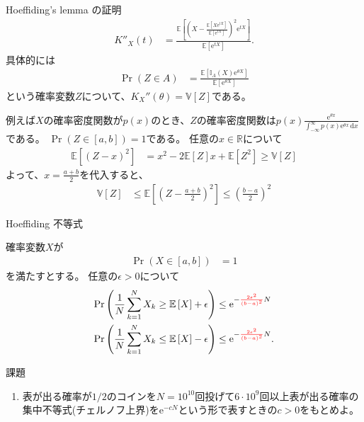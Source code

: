 \documentclass[lualatex,handout]{beamer}
\newcommand{\emm}[1]{\textcolor{red}{#1}}
\newcommand{\expt}[1]{\mathbb{E}\left[#1\right]}
\newcommand{\var}[1]{\mathbb{V}\left[#1\right]}
\newcommand\dx{{\,\mathrm{d}x}}
\theoremstyle{definition}
\begin{document}
\begin{frame}{Hoeffiding's lemma の証明}
\small
\begin{align*}
K''_X(t) 
&= \frac{\expt{\left(X-\frac{\expt{X\mathrm{e}^{tX}}}{\expt{\mathrm{e}^{tX}}}\right)^2\mathrm{e}^{tX}}}{\expt{\mathrm{e}^{tX}}}.
\end{align*}
具体的には
\begin{align*}
\Pr(Z\in A) &= \frac{\expt{\mathbb{I}_A(X)\mathrm{e}^{\theta X}}}{\expt{\mathrm{e}^{\theta X}}}
\end{align*}
という確率変数$Z$について、$K_X''(\theta) = \var{Z}$である。

例えば$X$の確率密度関数が$p(x)$のとき、$Z$の確率密度関数は$p(x)\frac{\mathrm{e}^{\theta x}}{\int_{-\infty}^\infty p(x)\mathrm{e}^{\theta x}\dx}$である。
$\Pr(Z\in[a,b])=1$である。
任意の$x\in\mathbb{R}$について
\begin{align*}
\expt{(Z-x)^2} &= x^2 - 2\expt{Z}x + \expt{Z^2}\ge \var{Z}
\end{align*}
よって、$x=\frac{a+b}2$を代入すると、
\begin{align*}
\var{Z} &\le \expt{\left(Z-\frac{a+b}2\right)^2}\le \left(\frac{b-a}2\right)^2
\end{align*}
\end{frame}

\begin{frame}{Hoeffiding 不等式}
\begin{theorem}
確率変数$X$が
\begin{align*}
\Pr(X\in[a,b])&=1
\end{align*}
を満たすとする。
任意の$\epsilon>0$について
\begin{align*}
\Pr\left(\frac1N\sum_{k=1}^N X_k \ge \expt{X} + \epsilon\right) &\le \mathrm{e}^{-\emm{\frac{2\epsilon^2}{(b-a)^2}}N}\\
\Pr\left(\frac1N\sum_{k=1}^N X_k \le \expt{X} - \epsilon\right) &\le \mathrm{e}^{-\emm{\frac{2\epsilon^2}{(b-a)^2}}N}.
\end{align*}
\end{theorem}
\end{frame}

\begin{frame}{課題}
\begin{enumerate}
\setlength{\itemsep}{2em}
\item 表が出る確率が$1/2$のコインを$N=10^{10}$回投げて$6\cdot 10^9$回以上表が出る確率の集中不等式(チェルノフ上界)を$\mathrm{e}^{-cN}$という形で表すときの$c>0$をもとめよ。
\end{enumerate}
\end{frame}

\end{document}
